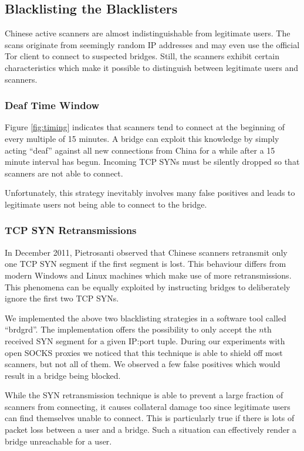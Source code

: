 \documentclass[runningheads,a4paper]{llncs}
\begin{document}
\subsection{Blacklisting the Blacklisters}
Chinese active scanners are almost indistinguishable from legitimate users. The scans originate from
seemingly random IP addresses and may even use the official Tor client to connect to suspected
bridges. Still, the scanners exhibit certain characteristics which make it possible to distinguish
between legitimate users and scanners.

\subsubsection{Deaf Time Window}
Figure \ref{fig:timing} indicates that scanners tend to connect at the beginning of every multiple
of 15 minutes. A bridge can exploit this knowledge by simply acting ``deaf'' against all new
connections from China for a while after a 15 minute interval has begun. Incoming TCP SYNs must be
silently dropped so that scanners are not able to connect.

Unfortunately, this strategy inevitably involves many false positives and leads to legitimate users
not being able to connect to the bridge.

\subsubsection{TCP SYN Retransmissions}
In December 2011, Pietrosanti \cite{fabio} observed that Chinese scanners retransmit only one TCP
SYN segment if the first segment is lost. This behaviour differs from modern Windows and Linux
machines which make use of more retransmissions. This phenomena can be equally exploited by
instructing bridges to deliberately ignore the first two TCP SYNs.

We implemented the above two blacklisting strategies in a software tool called ``brdgrd''. The
implementation offers the possibility to only accept the $n$th received SYN segment for a given
IP:port tuple. During our experiments with open SOCKS proxies we noticed that this technique is able
to shield off most scanners, but not all of them. We observed a few false positives which would
result in a bridge being blocked.

While the SYN retransmission technique is able to prevent a large fraction of scanners from
connecting, it causes collateral damage too since legitimate users can find themselves unable to
connect. This is particularly true if there is lots of packet loss between a user and a bridge.
Such a situation can effectively render a bridge unreachable for a user.
\end{document}
